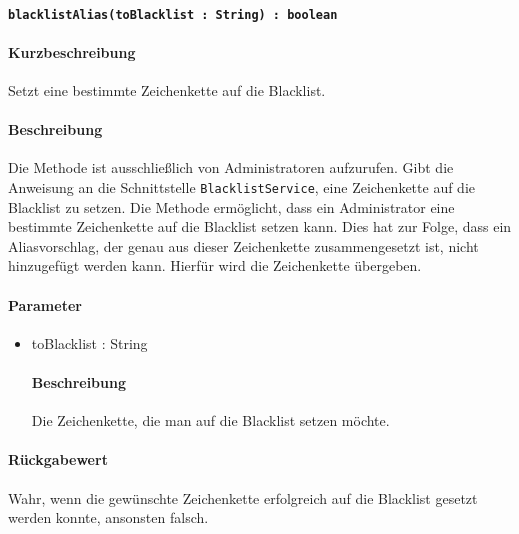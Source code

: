 \paragraph*{\texttt{blacklistAlias(toBlacklist : String) : boolean}}%
\paragraph*{Kurzbeschreibung}
Setzt eine bestimmte Zeichenkette auf die Blacklist.
\paragraph*{Beschreibung}
Die Methode ist ausschließlich von Administratoren aufzurufen.
Gibt die Anweisung an die Schnittstelle \texttt{BlacklistService}, eine Zeichenkette auf die Blacklist zu setzen.
Die Methode ermöglicht, dass ein Administrator eine bestimmte Zeichenkette auf die Blacklist setzen kann.
Dies hat zur Folge, dass ein Aliasvorschlag, der genau aus dieser Zeichenkette zusammengesetzt ist, nicht hinzugefügt werden kann.
Hierfür wird die Zeichenkette übergeben.
\paragraph*{Parameter}
\begin{itemize}
    \item toBlacklist : String
    		\paragraph*{Beschreibung}
    		Die Zeichenkette, die man auf die Blacklist setzen möchte.
\end{itemize}
\paragraph*{Rückgabewert}
Wahr, wenn die gewünschte Zeichenkette erfolgreich auf die Blacklist gesetzt werden konnte, ansonsten falsch.
